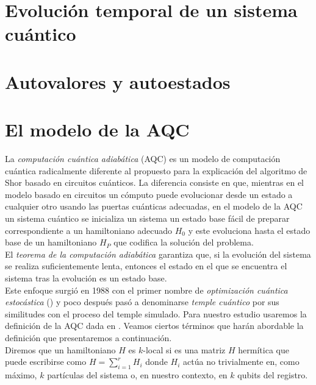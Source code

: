 \documentclass[11pt, spanish]{report}
\numberwithin{equation}{section}
\numberwithin{defin}{section}
\begin{document}
\begin{appendices}

\section{Evolución temporal de un sistema cuántico}

\section{Autovalores y autoestados}

\section{El modelo de la AQC}

La \emph{computación cuántica adiabática} (AQC) es un modelo de computación cuántica radicalmente diferente al propuesto para la explicación del algoritmo de Shor basado en circuitos cuánticos. La diferencia consiste en que, mientras en el modelo basado en circuitos un cómputo puede evolucionar desde un estado a cualquier otro usando las puertas cuánticas adecuadas, en el modelo de la AQC un sistema cuántico se inicializa un sistema un estado base fácil de preparar correspondiente a un hamiltoniano adecuado $H_0$ y este evoluciona hasta el estado base de un hamiltoniano $H_P$ que codifica la solución del problema.\\

El \emph{teorema de la computación adiabática} garantiza que, si la evolución del sistema se realiza suficientemente lenta, entonces el estado en el que se encuentra el sistema tras la evolución es un estado base.\\

Este enfoque surgió en 1988 con el primer nombre de \emph{optimización cuántica estocástica} (\cite{APOLLONI1989233}) y poco después pasó a denominarse \emph{temple cuántico} por sus similitudes con el proceso del temple simulado. Para nuestro estudio usaremos la definición de la AQC dada en \cite{2004quant.ph..5098A}. Veamos ciertos términos que harán abordable la definición que presentaremos a continuación.\\

Diremos que un hamiltoniano $H$ es $k$-local si es una matriz $H$ hermítica que puede escribirse como $H=\sum_{i=1}^rH_i$ donde $H_i$ actúa no trivialmente en, como máximo, $k$ partículas del sistema o, en nuestro contexto, en $k$ qubits del registro.\\ 



\end{appendices}
\end{document}
